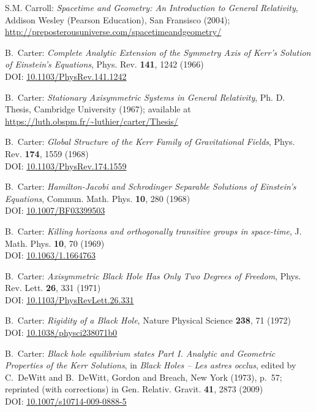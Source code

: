 \begin{thebibliography}{123}
S.M. Carroll: \emph{Spacetime and Geometry: An Introduction to General Relativity},
Addison Wesley (Pearson Education), San Fransisco (2004); \\
\url{http://preposterousuniverse.com/spacetimeandgeometry/}

B.~Carter:
{\em Complete Analytic Extension of the Symmetry Axis of Kerr's Solution of Einstein's Equations},
Phys. Rev. {\bf 141}, 1242 (1966)\\
DOI: \href{https://doi.org/10.1103/PhysRev.141.1242}{10.1103/PhysRev.141.1242}

B.~Carter: {\em Stationary Axisymmetric Systems in General Relativity},
Ph. D. Thesis, Cambridge University (1967); available at\\
\url{https://luth.obspm.fr/~luthier/carter/Thesis/}

B.~Carter:
{\em Global Structure of the Kerr Family of Gravitational Fields},
Phys. Rev. {\bf 174}, 1559 (1968)\\
DOI: \href{https://doi.org/10.1103/PhysRev.174.1559}{10.1103/PhysRev.174.1559}

B.~Carter:
{\em Hamilton-Jacobi and Schrodinger Separable Solutions of Einstein's Equations},
Commun. Math. Phys. {\bf 10}, 280 (1968)\\
DOI: \href{https://doi.org/10.1007/BF03399503}{10.1007/BF03399503}

B.~Carter:
{\em Killing horizons and orthogonally transitive groups in space-time},
J. Math. Phys. {\bf 10}, 70 (1969)\\
DOI: \href{https://doi.org/10.1063/1.1664763}{10.1063/1.1664763}

B.~Carter:
{\em Axisymmetric Black Hole Has Only Two Degrees of Freedom},
Phys. Rev. Lett. {\bf 26}, 331 (1971)\\
DOI: \href{https://doi.org/10.1103/PhysRevLett.26.331}{10.1103/PhysRevLett.26.331}

B.~Carter:
{\em Rigidity of a Black Hole},
Nature Physical Science {\bf 238}, 71 (1972)\\
DOI: \href{https://doi.org/10.1038/physci238071b0}{10.1038/physci238071b0}

B.~Carter:
{\em Black hole equilibrium states Part I.
Analytic and Geometric Properties of the Kerr Solutions},
in {\em Black Holes -- Les astres occlus},  edited by C.~DeWitt and B.~DeWitt,
Gordon and Breach, New York (1973), p.~57; reprinted (with corrections) in
Gen. Relativ. Gravit. {\bf 41}, 2873 (2009)\\
DOI: \href{https://doi.org/10.1007/s10714-009-0888-5}{10.1007/s10714-009-0888-5}


\end{thebibliography}
